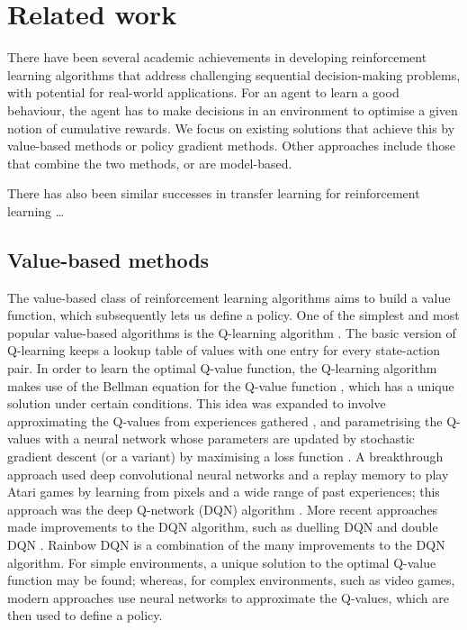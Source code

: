 \documentclass[12pt,a4paper]{article}
\begin{document}
\newpage
\section{Related work}
\label{section:related-work}
There have been several academic achievements in developing reinforcement learning algorithms that address challenging sequential decision-making problems, with  potential for real-world applications. For an agent to learn a good behaviour, the agent has to make decisions in an environment to optimise a given notion of cumulative rewards. We focus on existing solutions that achieve this by value-based methods or policy gradient methods. Other approaches include those that combine the two methods, or are model-based.

There has also been similar successes in transfer learning for reinforcement learning \dots

\subsection{Value-based methods}
The value-based class of reinforcement learning algorithms aims to build a value function, which subsequently lets us define a policy. One of the simplest and most popular value-based algorithms is the Q-learning algorithm \cite{Watkins1992}. The basic version of Q-learning keeps a lookup table of values with one entry for every state-action pair. In order to learn the optimal Q-value function, the Q-learning algorithm makes use of the Bellman equation for the Q-value function \cite{R-352-PR}, which has a unique solution under certain conditions. This idea was expanded to involve approximating the Q-values from experiences gathered \cite{10.5555/2998828.2998976}, and parametrising the Q-values with a neural network whose parameters are updated by stochastic gradient descent (or a variant) by maximising a loss function \cite{10.1007/11564096_32}. A breakthrough approach used deep convolutional neural networks and a replay memory to play Atari games by learning from pixels and a wide range of past experiences; this approach was the deep Q-network (DQN) algorithm \cite{DBLP:journals/corr/MnihKSGAWR13}. More recent approaches made improvements to the DQN algorithm, such as duelling DQN \cite{DBLP:journals/corr/WangFL15} and double DQN \cite{DBLP:journals/corr/HasseltGS15}. Rainbow DQN \cite{DBLP:journals/corr/abs-1710-02298} is a combination of the many improvements to the DQN algorithm. For simple environments, a unique solution to the optimal Q-value function may be found; whereas, for complex environments, such as video games, modern approaches use neural networks to approximate the Q-values, which are then used to define a policy. 
\end{document}
